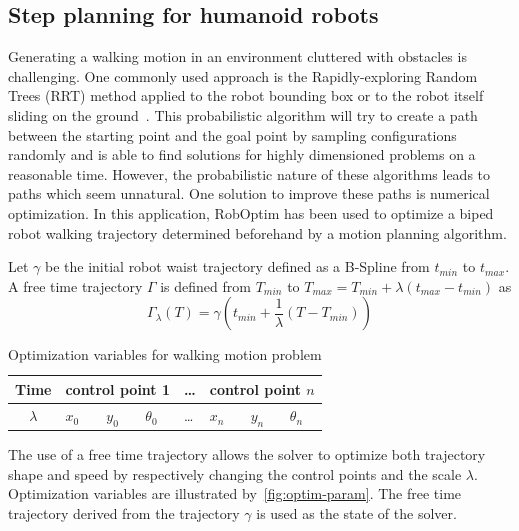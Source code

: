 \documentclass[conference,final,a4paper,twocolumn,9pt]{IEEEtran}
\begin{document}
\subsection{Step planning for humanoid robots}


Generating a walking motion in an environment cluttered with obstacles
is challenging. One commonly used approach is the Rapidly-exploring
Random Trees (RRT) method applied to the robot bounding box or to the
robot itself sliding on the ground~\cite{dalibard2011small}.  This
probabilistic algorithm will try to create a path between the starting
point and the goal point by sampling configurations randomly and is
able to find solutions for highly dimensioned problems on a reasonable
time. However, the probabilistic nature of these algorithms leads to
paths which seem unnatural. One solution to improve these paths is
numerical optimization. In this application, RobOptim has been used to
optimize a biped robot walking trajectory determined beforehand by a
motion planning algorithm.

Let $\gamma$ be the initial robot waist trajectory defined as a
B-Spline from $t_{min}$ to $t_{max}$. A free time trajectory $\Gamma$
is defined from $T_{min}$ to \linebreak $T_{max} = T_{min} + \lambda
(t_{max} - t_{min})$ as
\begin{equation}
  \Gamma_{\lambda} (T) = \gamma (t_{min} + \frac{1}{\lambda} (T -
  T_{min}))
\end{equation}

\begin{table}[ht!]
  \begin{center}
    \begin{tabular}{|c|l l l| l |l l l|}
      \hline
      Time
      & \multicolumn{3}{|c|}{control point 1}
      & \ldots
      & \multicolumn{3}{|c|}{control point $n$}\\
      \hline
      $\lambda$
      & $x_0$ & $y_0$ & $\theta_0$
      & \ldots
      & $x_n$ & $y_n$ & $\theta_n$\\
      \hline
    \end{tabular}
  \end{center}
  \caption{Optimization variables for walking motion problem\label{fig:optim-param}}
\end{table}


The use of a free time trajectory allows the solver to optimize both
trajectory shape and speed by respectively changing the control points
and the scale $\lambda$. Optimization variables are illustrated
by~\autoref{fig:optim-param}. The free time trajectory derived from
the trajectory $\gamma$ is used as the state of the solver.
\end{document}
